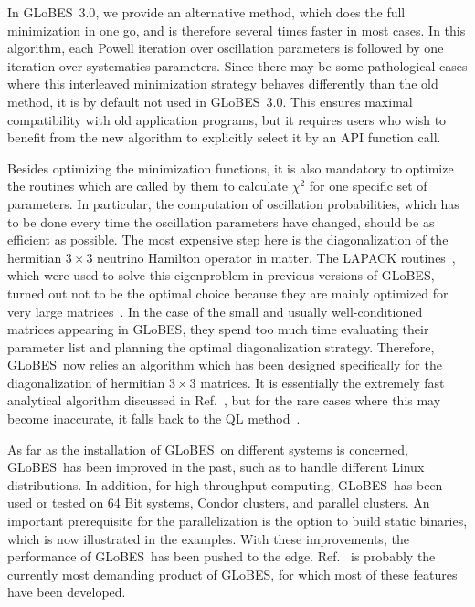 \documentclass[12pt,a4paper]{article}
\newcommand{\Ref}{Ref.}
\newcommand{\GLOBES}{{\sf GLoBES}}
\newcommand{\GLOBESN}{{\sf GLoBES~3.0}}
\begin{document}
In \GLOBESN , we provide an alternative method, which does the full minimization
in one go, and is therefore several times faster in most cases. In this algorithm,
each Powell iteration over oscillation parameters is followed by one iteration
over systematics parameters. Since there may be some pathological cases where this
interleaved minimization strategy behaves differently than the old method,
it is by default not used in \GLOBESN . This ensures maximal compatibility
with old application programs, but it requires users who wish to benefit from the
new algorithm to explicitly select it by an API function call.

Besides optimizing the minimization functions, it is also mandatory to
optimize the routines which are called by them to calculate $\chi^2$
for one specific set of parameters. In particular, the computation of
oscillation probabilities, which has to be done every time the oscillation
parameters have changed, should be as efficient as possible. The most expensive
step here is the diagonalization of the hermitian $3\times3$ neutrino Hamilton
operator in matter. The LAPACK routines~\cite{Anderson:LAPACK}, which were
used to solve this eigenproblem in previous versions of \GLOBES, turned out
not to be the optimal choice because they are mainly optimized for very large
matrices~\cite{Kopp:2006wp}. In the case of the small and usually well-conditioned
matrices appearing in \GLOBES, they spend too much time evaluating their parameter
list and planning the optimal diagonalization strategy. Therefore, \GLOBES\ now
relies an algorithm which has been designed specifically for the diagonalization
of hermitian $3\times3$ matrices. It is essentially the extremely fast analytical
algorithm discussed in \Ref~\cite{Kopp:2006wp}, but for the rare cases where this may become
inaccurate, it falls back to the QL method~\cite{Fra61,Stoer:NumAnalysis}.

As far as the installation of \GLOBES\ on different systems is concerned, \GLOBES\
has been improved in the past, such as to handle different Linux distributions.
In addition, for high-throughput computing, \GLOBES\ has been used or tested
on 64 Bit systems, Condor clusters, and parallel clusters. An important prerequisite
for the parallelization is the option to build static binaries, which is now
illustrated in the examples. With these improvements, the performance of \GLOBES\
has been pushed to the edge. \Ref~\cite{Huber:2006wb} is probably the currently
most demanding product of \GLOBES , for which most of these features
have been developed.
\end{document}
